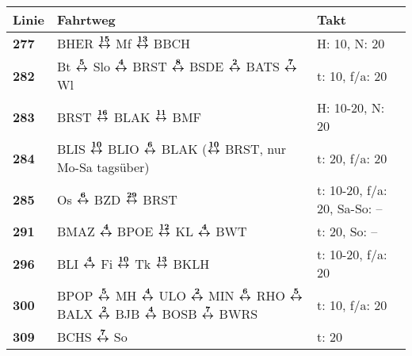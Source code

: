 \ifnacht
\begin{minipage}[t]{0.05\textwidth}
\phantom{Tor}
\end{minipage}
\begin{minipage}[t]{0.45\textwidth}
\begin{tabular}{>{\bfseries}L{1.2cm}L{9.0cm}L{3.0cm}}
{\bfseries Linie} & {\bfseries Fahrtweg} & {\bfseries Takt} \\
\hline
\bus{} 277    & BHER $\boldsymbol{\overset{15}{\leftrightarrow}}$ Mf $\boldsymbol{\overset{13}{\leftrightarrow}}$ BBCH                                                                                                                              & H: 10, N: 20               \\
\bus{} 282    & Bt $\boldsymbol{\overset{5}{\leftrightarrow}}$ Slo $\boldsymbol{\overset{4}{\leftrightarrow}}$ BRST $\boldsymbol{\overset{8}{\leftrightarrow}}$ BSDE $\boldsymbol{\overset{2}{\leftrightarrow}}$ BATS $\boldsymbol{\overset{7}{\leftrightarrow}}$ Wl                                                                                & t: 10, f/a: 20             \\
\bus{} 283    & BRST $\boldsymbol{\overset{16}{\leftrightarrow}}$ BLAK $\boldsymbol{\overset{11}{\leftrightarrow}}$ BMF                                                                                                                             & H: 10-20, N: 20            \\
\bus{} 284    & BLIS $\boldsymbol{\overset{10}{\leftrightarrow}}$ BLIO $\boldsymbol{\overset{6}{\leftrightarrow}}$ BLAK ($\boldsymbol{\overset{10}{\leftrightarrow}}$ BRST, nur Mo-Sa tagsüber)                                                                                     & t: 20, f/a: 20             \\
\bus{} 285    & Os $\boldsymbol{\overset{6}{\leftrightarrow}}$ BZD $\boldsymbol{\overset{29}{\leftrightarrow}}$ BRST                                                                                                                                & t: 10-20, f/a: 20, Sa-So: -- \\
\bus{} 291    & BMAZ $\boldsymbol{\overset{4}{\leftrightarrow}}$ BPOE $\boldsymbol{\overset{12}{\leftrightarrow}}$ KL $\boldsymbol{\overset{4}{\leftrightarrow}}$ BWT                                                                                                               & t: 20, So: --              \\
\bus{} 296    & BLI $\boldsymbol{\overset{4}{\leftrightarrow}}$ Fi $\boldsymbol{\overset{10}{\leftrightarrow}}$ Tk $\boldsymbol{\overset{13}{\leftrightarrow}}$ BKLH                                                                                                                & t: 10-20, f/a: 20          \\
\bus{} 300    & BPOP $\boldsymbol{\overset{5}{\leftrightarrow}}$ MH $\boldsymbol{\overset{4}{\leftrightarrow}}$ ULO $\boldsymbol{\overset{2}{\leftrightarrow}}$ MIN $\boldsymbol{\overset{6}{\leftrightarrow}}$ RHO $\boldsymbol{\overset{5}{\leftrightarrow}}$ BALX $\boldsymbol{\overset{2}{\leftrightarrow}}$ BJB $\boldsymbol{\overset{4}{\leftrightarrow}}$ BOSB $\boldsymbol{\overset{7}{\leftrightarrow}}$ BWRS                              & t: 10, f/a: 20             \\
\bus{} 309    & BCHS $\boldsymbol{\overset{7}{\leftrightarrow}}$ So                                                                                                                                                 & t: 20                      \\

\end{tabular}
\end{minipage}
